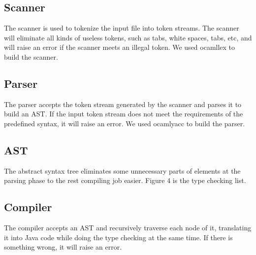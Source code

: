 \documentclass[12pt]{article} %
\begin{document}
\subsection{Scanner}
The scanner is used to tokenize the input file into token streams. The scanner will eliminate all kinds of useless tokens, such as tabs, white spaces, tabs, etc, and will raise an error if the scanner meets an illegal token. We used ocamllex to build the scanner.

\subsection{Parser}
The parser accepts the token stream generated by the scanner and parses it to build an AST. If the input token stream does not meet the requirements of the predefined syntax, it will raise an error. We used ocamlyacc to build the parser.

\subsection{AST}
The abstract syntax tree eliminates some unnecessary parts of elements at the parsing phase to the rest compiling job easier.  Figure 4 is the type checking list.

\subsection{Compiler}
The compiler accepts an AST and recursively traverse each node of it, translating it into Java code while doing the type checking at the same time. If there is something wrong, it will raise an error.   
\end{document}
